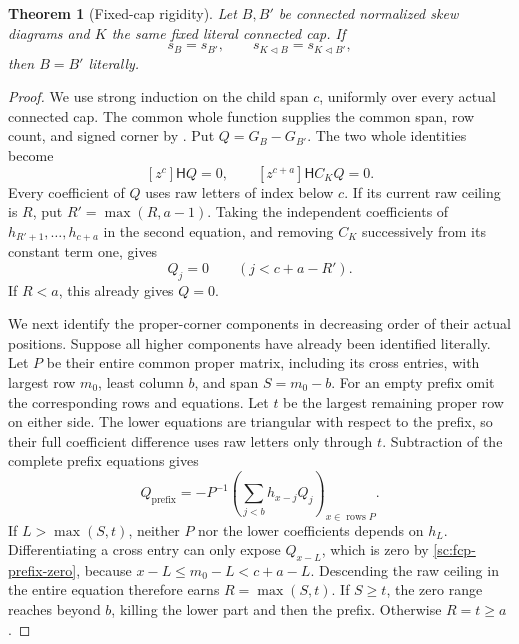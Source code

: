 \documentclass[11pt,a4paper]{amsart}
\numberwithin{equation}{section}
\theoremstyle{plain}
\newtheorem{theorem}{Theorem}[section]
\theoremstyle{definition}
\begin{document}
\begin{theorem}[Fixed-cap rigidity]\label{sc:fixed-cap}
Let \(B,B'\) be connected normalized skew diagrams and \(K\) the same
fixed literal connected cap.  If
\[
 s_B=s_{B'},\qquad s_{K\triangleleft B}=s_{K\triangleleft B'},
\]
then \(B=B'\) literally.
\end{theorem}
\begin{proof}
We use strong induction on the child span \(c\), uniformly over every
actual connected cap.  The common whole function supplies the common
span, row count, and signed corner by .  Put
\(Q=G_B-G_{B'}\).  The two whole identities become
\begin{equation}\label{sc:fcp-observations}
 [z^c]\mathsf H Q=0,
 \qquad [z^{c+a}]\mathsf H C_KQ=0.
\end{equation}
Every coefficient of \(Q\) uses raw letters of index below \(c\).
If its current raw ceiling is \(R\), put \(R'=\max(R,a-1)\).
Taking the independent coefficients of
\(h_{R'+1},\ldots,h_{c+a}\) in the second equation, and removing
\(C_K\) successively from its constant term one, gives
\begin{equation}\label{sc:fcp-prefix-zero}
 Q_j=0\qquad(j<c+a-R').
\end{equation}
If \(R<a\), this already gives \(Q=0\).

We next identify the proper-corner components in decreasing order of
their actual positions.  Suppose all higher components have already
been identified literally.  Let \(P\) be their entire common proper
matrix, including its cross entries, with largest row \(m_0\), least
column \(b\), and span \(S=m_0-b\).  For an empty prefix omit the
corresponding rows and equations.  Let \(t\) be the largest remaining
proper row on either side.  The lower equations are triangular with
respect to the prefix, so their full coefficient difference uses raw
letters only through \(t\).  Subtraction of the complete prefix equations
gives
\begin{equation}\label{sc:fcp-prefix-solve}
 Q_{\mathrm{prefix}}
   =-P^{-1}\left(\sum_{j<b}h_{x-j}Q_j\right)_{x\in\operatorname{rows}P}.
\end{equation}
If \(L>\max(S,t)\), neither \(P\) nor the lower coefficients depends on
\(h_L\).  Differentiating a cross entry can only expose \(Q_{x-L}\),
which is zero by \eqref{sc:fcp-prefix-zero}, because
\(x-L\le m_0-L<c+a-L\).  Descending the raw ceiling in the entire
equation therefore earns \(R=\max(S,t)\).  If \(S\ge t\), the zero
range reaches beyond \(b\), killing the lower part and then the prefix.
Otherwise \(R=t\ge a\).


\end{proof}
\end{document}
